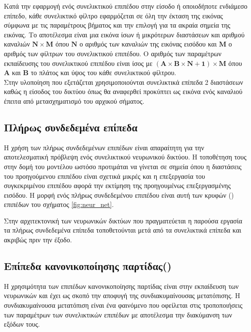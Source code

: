 Κατά την εφαρμογή ενός συνελικτικού επιπέδου στην είσοδο ή οποιοδήποτε ενδιάμεσο επίπεδο, κάθε συνελικτικό φίλτρο εφαρμόζεται σε όλη την έκταση της εικόνας σύμφωνα με τις παραμέτρους βήματος και την επιλογή για τα ακραία σημεία της εικόνας. Το αποτέλεσμα είναι μια εικόνα ίσων ή μικρότερων διαστάσεων και αριθμού καναλιών $\mathbf{N\times M}$ όπου $\mathbf{N}$ ο αριθμός των καναλιών της εικόνας εισόδου και $\mathbf{M}$ ο αριθμός των φίλτρων του συνελικτικού επιπέδου. Ο αριθμός των παραμέτρων εκπαίδευσης του συνελικτικού επιπέδου είναι ίσος με $\mathbf{\left(A \times B\times N+1\right)\times M}$ όπου $\mathbf{A}$ και $\mathbf{B}$ το πλάτος και ύψος του κάθε συνελικτικού φίλτρου.\\

Στην υλοποίηση που εξετάζεται χρησιμοποιούνται συνελικτικά επίπεδα 2 διαστάσεων καθώς η είσοδος του δικτύου όπως θα αναφερθεί προκύπτει ως εικόνα ενός καναλιού έπειτα από μετασχηματισμό του αρχικού σήματος.

\subsection{Πλήρως συνδεδεμένα επίπεδα}
Η χρήση των πλήρως συνδεδεμένων επιπέδων είναι απαραίτητη για την αποτελεσματική πρόβλεψη ενός συνελικτικού νευρωνικού δικτύου. Η τοποθέτηση τους στην δομή του μοντέλου ωστόσο προτιμάται να γίνεται σε σημεία όπου η διαστάσεις του προηγούμενου επιπέδου είναι σχετικά μικρές και η επεξεργασία του συγκεκριμένου επιπέδου αφορά την εκτίμηση της προηγουμένως επεξεργασμένης εισόδου. Η μορφή ενός πλήρως συνδεδεμένου επιπέδου είναι αυτή των κρυφών (\textbf{}) επιπέδων του σχήματος \ref{fig:neur_net}.

Στην αρχιτεκτονική των νευρωνικών δικτύων που πραγματεύεται η παρούσα εργασία τα πλήρως συνδεδεμένα επίπεδα τοποθετούνται μετά από τα συνελικτικά επίπεδα και ακριβώς πριν την έξοδο.

\subsection{Επίπεδα κανονικοποίησης παρτίδας()}
Η χρησιμότητα των επιπέδων κανονικοποίησης παρτίδας είναι στην εκπαίδευση των νευρωνικών και έχει ως σκοπό την αποφυγή της συνδιακυμαίνουσας μετατόπισης. Η συνδιακυμαίνουσα μετατόπιση είναι ένα φαινόμενο που οφείλεται στις τροποποιήσεις των παραμέτρων των συνελικτικών επιπέδων με αποτέλεσμα την διακύμανση των εξόδων τους.\\

